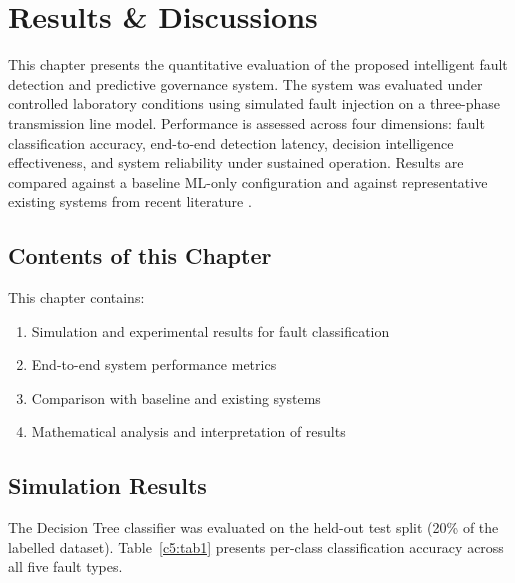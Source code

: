 \chapter{Results \& Discussions}

This chapter presents the quantitative evaluation of the proposed intelligent fault detection and predictive governance system. The system was evaluated under controlled laboratory conditions using simulated fault injection on a three-phase transmission line model. Performance is assessed across four dimensions: fault classification accuracy, end-to-end detection latency, decision intelligence effectiveness, and system reliability under sustained operation. Results are compared against a baseline ML-only configuration and against representative existing systems from recent literature \cite{Zhang2025,Anwar2025,EdgeML2024}.

\section{Contents of this Chapter}
This chapter contains:
\begin{enumerate}
\item Simulation and experimental results for fault classification
\item End-to-end system performance metrics
\item Comparison with baseline and existing systems
\item Mathematical analysis and interpretation of results
\end{enumerate}

\section{Simulation Results}

The Decision Tree classifier was evaluated on the held-out test split (20\% of the labelled dataset). Table~\ref{c5:tab1} presents per-class classification accuracy across all five fault types.

